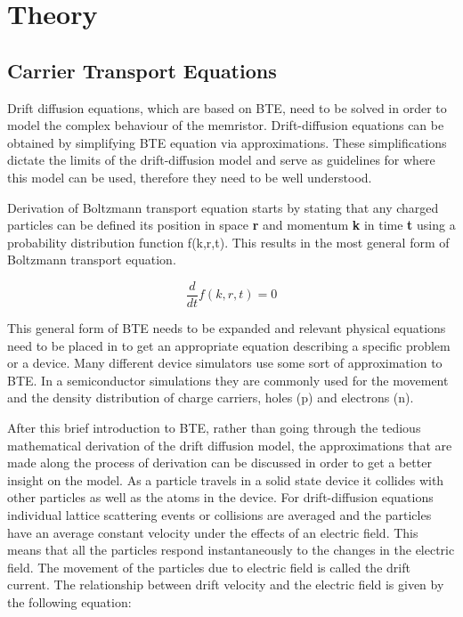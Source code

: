 
\chapter{Theory} %

\label{Chapter2} %


\section{Carrier Transport Equations}
Drift diffusion equations, which are based on BTE, need to be solved in order to model the complex behaviour of the memristor. Drift-diffusion equations can be obtained by simplifying BTE equation via approximations. These simplifications dictate the limits of the drift-diffusion model and serve as guidelines for where this model can be used, therefore they need to be well understood.

Derivation of Boltzmann transport equation starts by stating that any charged particles can be defined its position in space \textbf{r} and momentum \textbf{k} in time \textbf{t} using a probability distribution function f(k,r,t). This results in the most general form of Boltzmann transport equation. \cite{snowden} 

\begin{equation}
\frac{d }{dt}f(k,r,t)=0
\end{equation}

This general form of BTE needs to be expanded and relevant physical equations need to be placed in to get an appropriate equation describing a specific problem or a device. 
Many different device simulators use some sort of approximation to BTE. In a semiconductor simulations they are commonly used for the movement and the density distribution of charge carriers, holes (p) and electrons (n). 

After this brief introduction to BTE, rather than going through the tedious mathematical derivation of the drift diffusion model, the approximations that are made along the process of derivation can be discussed in order to get a better insight on the model.  As a particle travels in a solid state device it collides with other particles as well as the atoms in the device. For drift-diffusion equations individual lattice scattering events or collisions are averaged and the particles have an average constant velocity under the effects of an electric field. This means that all the particles respond instantaneously to the changes in the electric field. The movement of the particles due to electric field is called the drift current. The relationship between drift velocity and the electric field is given by the following equation:

